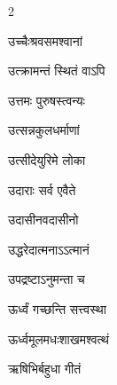 \begin{multicols}{2}
\begin{indexlist}
\item उच्चैःश्रवसमश्वानां \dotfill {}
\item उत्क्रामन्तं स्थितं वाऽपि \dotfill {}
\item उत्तमः पुरुषस्त्वन्यः \dotfill {}
\item उत्सन्नकुलधर्माणां \dotfill {}
\item उत्सीदेयुरिमे लोका \dotfill {}
\item उदाराः सर्व एवैते \dotfill {}
\item उदासीनवदासीनो \dotfill {}
\item उद्धरेदात्मनाऽऽत्मानं \dotfill {}
\item उपद्रष्टाऽनुमन्ता च \dotfill {}
\end{indexlist}

\begin{indexlist}
\item ऊर्ध्वं गच्छन्ति सत्त्वस्था \dotfill {}
\item ऊर्ध्वमूलमधःशाखमश्वत्थं \dotfill {}
\end{indexlist}

\begin{indexlist}
\item ऋषिभिर्बहुधा गीतं \dotfill {}
\end{indexlist}


\end{multicols}
